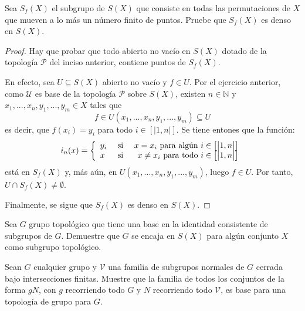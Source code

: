 \documentclass[12pt]{report}
\theoremstyle{largebreak}
\newcommand{\natint}[1]{\ensuremath{\left[\big|#1\big|\right]}}
\begin{document}
    \begin{excer}
        Sea $S_f(X)$ el subgrupo de $S(X)$ que consiste en todas las permutaciones de $X$ que mueven a lo más un número finito de puntos. Pruebe que $S_f(X)$ es denso en $S(X)$.
    \end{excer}

    \begin{proof}
        Hay que probar que todo abierto no vacío en $S(X)$ dotado de la topología $\mathcal{P}$ del inciso anterior, contiene puntos de $S_f(X)$.
        
        En efecto, sea $U\subseteq S(X)$ abierto no vacío y $f\in U$. Por el ejercicio anterior, como $\mathcal{U}$ es base de la topología $\mathcal{P}$ sobre $S(X)$, existen $n\in\mathbb{N}$ y $x_1,...,x_n,y_1,...,y_m\in X$ tales que
        \begin{equation*}
            f\in U(x_1,...,x_n,y_1,...,y_m)\subseteq U
        \end{equation*}
        es decir, que $f(x_i)=y_i$ para todo $i\in\natint{1,n}$. Se tiene entones que la función:
        \begin{equation*}
            i_n(x)=\left\{
                \begin{array}{lcr}
                    y_i & \textup{ si } & x=x_i\textup{ para algún }i\in\natint{1,n} \\
                    x & \textup{ si } & x\neq x_i\textup{ para todo }i\in\natint{1,n}\\
                \end{array}
            \right.
        \end{equation*}
        está en $S_f(X)$ y, más aún, en $U(x_1,...,x_n,y_1,...,y_m)$, luego $f\in U$. Por tanto, $U\cap S_f(X)\neq\emptyset$.

        Finalmente, se sigue que $S_f(X)$ es denso en $S(X)$.

    \end{proof}

    \begin{excer}[*]
        Sea $G$ grupo topológico que tiene una base en la identidad consistente de subgrupos de $G$. Demuestre que $G$ se encaja en $S(X)$ para algún conjunto $X$ como subgrupo topológico.
    \end{excer}

    \begin{excer}
        Sean $G$ cualquier grupo y $\mathcal{V}$ una familia de subgrupos normales de $G$ cerrada bajo intersecciones finitas. Muestre que la familia de todos los conjuntos de la forma $gN$, con $g$ recorriendo todo $G$ y $N$ recorriendo todo $\mathcal{V}$, es base para una topología de grupo para $G$.
    \end{excer}
\end{document}
